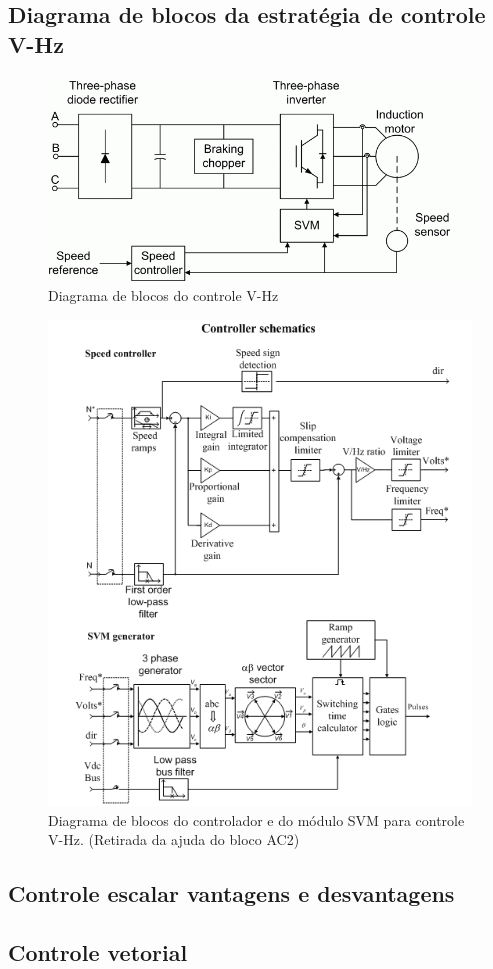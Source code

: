 \documentclass{article}
\begin{document}
\subsection{Diagrama de blocos da estratégia de controle V-Hz}
\begin{figure}[H]
	\centering
	\includegraphics[width=\linewidth]{esqG}
	\caption{Diagrama de blocos do controle V-Hz \cite{bb:mathworks}}
	\label{fig:esqG}
\end{figure}


\begin{figure}[H]
	\centering
	\includegraphics[width=\linewidth]{esqC}
	\caption{Diagrama de blocos do controlador e do módulo SVM para controle V-Hz. (Retirada da ajuda do bloco AC2)}
	\label{fig:esqC}
\end{figure}


\subsection{Controle escalar vantagens e desvantagens}
\subsection{Controle vetorial}

\end{document}
